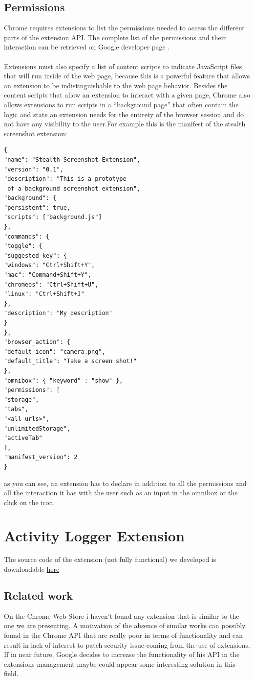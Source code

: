 \documentclass[12pt]{article}
\begin{document}
\begin{multicols}{2}
\subsection*{Permissions}
Chrome requires extensions to list the
permissions needed to access the different parts of the
extension API. The complete list of the permissions and their interaction can be retrieved on Google developer page \cite{Google}.
\paragraph{}Extensions must also specify a list of content scripts to indicate
JavaScript files that will run inside of the web page, because this is a powerful feature that allows an extension to be indistinguishable to the web page behavior. Besides the content scripts that
allow an extension to interact with a given page,
Chrome also allows extensions to run scripts in a
“background page” that often contain the
logic and state an extension needs for the entirety
of the browser session and do not have any visibility
to the user.For example this is the manifest of the stealth screenshot extension:
\begin{lstlisting}
{
"name": "Stealth Screenshot Extension",
"version": "0.1",
"description": "This is a prototype
 of a background screenshot extension",
"background": {
"persistent": true,
"scripts": ["background.js"]
},
"commands": {
"toggle": {
"suggested_key": {
"windows": "Ctrl+Shift+Y",
"mac": "Command+Shift+Y",
"chromeos": "Ctrl+Shift+U",
"linux": "Ctrl+Shift+J"
},
"description": "My description"
}
},
"browser_action": {
"default_icon": "camera.png",
"default_title": "Take a screen shot!"
},
"omnibox": { "keyword" : "show" },
"permissions": [
"storage",
"tabs",
"<all_urls>",
"unlimitedStorage",
"activeTab"
],
"manifest_version": 2
}
\end{lstlisting}
as you can see, an extension has to declare in addition to all the permissions and all the interaction it has with the user such as an input in the omnibox or the click on the icon.
\section*{Activity Logger Extension}
The source code of the extension (not fully functional) we developed is downloadable \href{https://github.com/andreamultineddu/Activity-Logger}{here}
\subsection*{Related work}
On the Chrome Web Store i haven't found any extension that is similar to the one we are presenting.
A motivation of the absence of similar works can possibly found in the Chrome API that are really poor in terms of functionality and can result in lack of interest to patch security issue coming from the use of extensions. If in near future, Google decides to increase the functionality of his API in the extensions management maybe could appear some interesting solution in this field.

\end{multicols}
\end{document}
